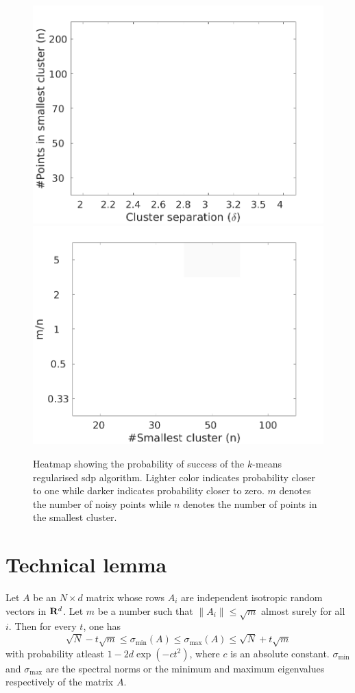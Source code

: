 \begin{figure}
  \includegraphics[width=\textwidth]{figures/optimizationClustering/deltan.png}
  \includegraphics[width=\textwidth]{figures/optimizationClustering/nM.png}
  \caption{Heatmap showing the probability of success of the $k$-means regularised sdp algorithm. Lighter color indicates probability closer to one while darker indicates probability closer to zero. $m$ denotes the number of noisy points while $n$ denotes the number of points in the smallest cluster.}  
\end{figure}

\section{Technical lemma}
\begin{theorem}
\label{a-thm:spectralNormCOncentration}
Let $A$ be an $N\times d$ matrix whose rows $A_i$ are independent isotropic random vectors in $\mathbf R^d$. Let $m$ be a number such that $\|A_i\| \le \sqrt{m}$ almost surely for all $i$. Then for every $t$, one has
$$\sqrt{N} - t\sqrt{m} \le \sigma_{\min}(A) \le \sigma_{\max}(A) \le \sqrt{N} + t\sqrt{m}$$
with probability atleast $1-2d\exp(-ct^2)$, where $c$ is an absolute constant. $\sigma_{\min}$ and $\sigma_{\max}$ are the spectral norms or the minimum and maximum eigenvalues respectively of the matrix $A$.
\end{theorem}
